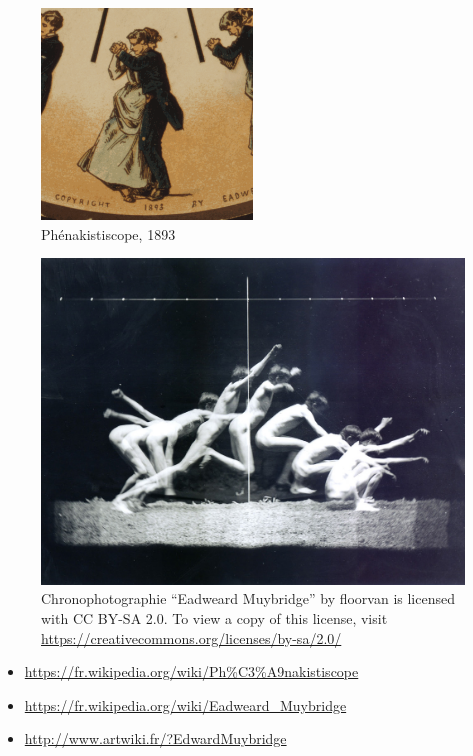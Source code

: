 \documentclass[
]{book}
\providecommand{\tightlist}{%
  \setlength{\itemsep}{0pt}\setlength{\parskip}{0pt}}
\begin{document}
\begin{figure}
\centering
\includegraphics[width=0.5\textwidth,height=\textheight]{medias/corpus/muybridge/Phenakistoscope.gif}
\caption{Phénakistiscope, 1893}
\end{figure}

\begin{figure}
\centering
\includegraphics{medias/corpus/muybridge/3695958436_43ae8a57db_b.jpg}
\caption{Chronophotographie ``Eadweard Muybridge'' by floorvan is licensed with CC BY-SA 2.0. To view a copy of this license, visit \url{https://creativecommons.org/licenses/by-sa/2.0/}}
\end{figure}

\begin{itemize}
\tightlist
\item
  \url{https://fr.wikipedia.org/wiki/Ph\%C3\%A9nakistiscope}
\item
  \url{https://fr.wikipedia.org/wiki/Eadweard_Muybridge}
\item
  \url{http://www.artwiki.fr/?EdwardMuybridge}
\end{itemize}
\end{document}
